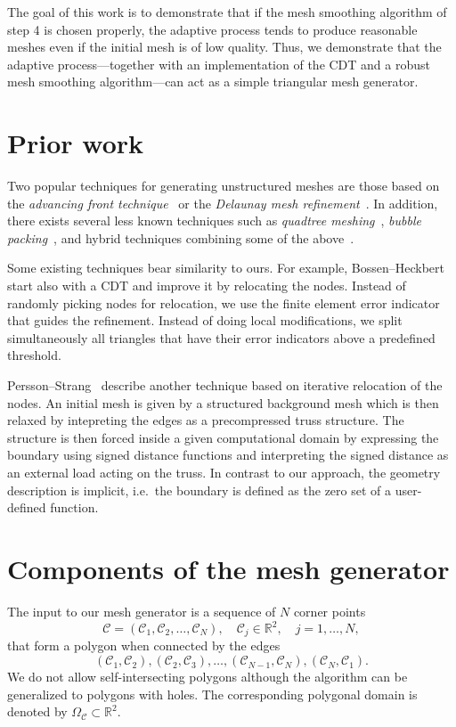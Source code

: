 \documentclass[12pt]{article}
\begin{document}
The goal of this work is to demonstrate that if the mesh smoothing algorithm of
step 4 is chosen properly, the adaptive process tends to produce reasonable
meshes even if the initial mesh is of low quality.  Thus, we demonstrate that
the adaptive process---together with an implementation of the CDT and a robust
mesh smoothing algorithm---can act as a simple triangular mesh generator.

\section{Prior work}
\label{sec:org7798f6d}

Two popular techniques for generating unstructured meshes are those based on the
\emph{advancing front technique}~\cite{L_hner_1988} or the \emph{Delaunay mesh
refinement}~\cite{Chew_1989, Ruppert_1995, Shewchuk_2002}.  In addition, there
exists several less known techniques such as \emph{quadtree
meshing}~\cite{Yerry_1983}, \emph{bubble packing}~\cite{Shimada_1995}, and
hybrid techniques combining some of the above~\cite{mavriplis1995advancing}.

Some existing techniques bear similarity to ours.  For example,
Bossen--Heckbert~\cite{bossen1996pliant} start also with a CDT and improve it by
relocating the nodes.  Instead of randomly picking nodes for relocation, we use
the finite element error indicator that guides the refinement.  Instead of doing
local modifications, we split simultaneously all triangles that have their error indicators
above a predefined threshold.

Persson--Strang~\cite{persson2004simple} describe another technique based on
iterative relocation of the nodes.  An initial mesh is given by a structured
background mesh which is then relaxed by intepreting the edges as a
precompressed truss structure.  The structure is then forced inside a given
computational domain by expressing the boundary using signed distance functions
and interpreting the signed distance as an external load acting on the truss.
In contrast to our approach, the geometry description is implicit, i.e.~the
boundary is defined as the zero set of a user-defined function.

\section{Components of the mesh generator}
\label{sec:components}

The input to
our mesh generator is a sequence of \(N\) corner points
$$\mathcal{C} = (\mathcal{C}_1, \mathcal{C}_2, \dots, \mathcal{C}_N), \quad \mathcal{C}_j \in \mathbb{R}^2, \quad j = 1,\dots,N,$$
that form a polygon when connected by the edges
$$(\mathcal{C}_1, \mathcal{C}_2), (\mathcal{C}_2,\mathcal{C}_3),
\dots, (\mathcal{C}_{N-1}, \mathcal{C}_N), (\mathcal{C}_N,\mathcal{C}_1).$$
We do not allow self-intersecting polygons although
the algorithm can be generalized to polygons
with holes.
The corresponding polygonal domain is denoted
by \(\Omega_{\mathcal{C}} \subset \mathbb{R}^2\).
\end{document}
